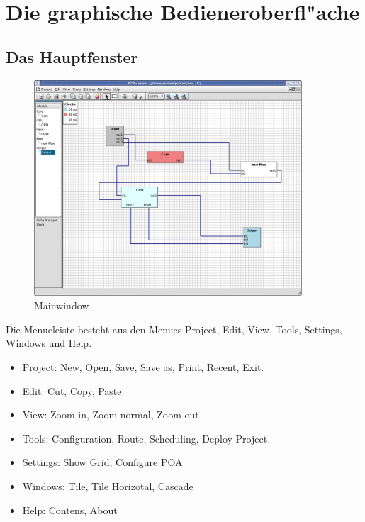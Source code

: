 \documentclass[a4paper,titlepage,12pt,ngerman]{scrbook}
\begin{document}
\chapter{Die graphische Bedieneroberfl"ache}

\section{Das Hauptfenster}
\begin{figure}[htbp]

\begin{center}

\includegraphics[width=10cm]{Mainwindow1}

\caption{Mainwindow}\label{test}

\end{center}

\end{figure}

Die Menueleiste besteht aus den Menues Project, Edit, View, Tools, Settings, Windows und Help.

\begin{itemize}
\item Project:	New, Open, Save, Save as, Print, Recent, Exit.
\item Edit: 	Cut, Copy, Paste
\item View: 	Zoom in, Zoom normal, Zoom out 
\item Tools: 	Configuration, Route, Scheduling, Deploy Project
\item Settings:	Show Grid, Configure POA
\item Windows: 	Tile, Tile Horizotal, Cascade
\item Help: 	Contens, About
\end{itemize}
\end{document}
